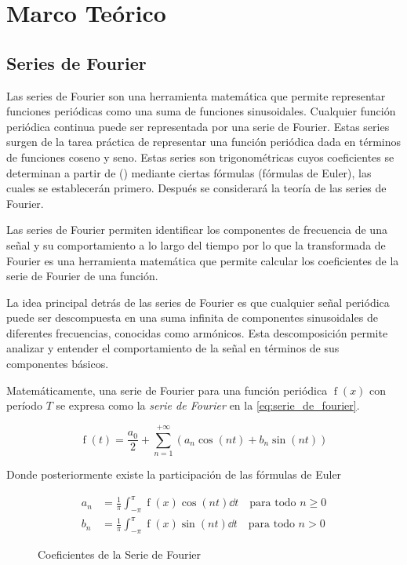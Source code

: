 \section{Marco Teórico }
\subsection{Series de Fourier}

Las series de Fourier son una herramienta matemática que permite representar funciones periódicas como una suma de funciones sinusoidales. Cualquier función periódica continua puede ser representada por una serie de Fourier. Estas series surgen de la tarea práctica de representar una función periódica dada en términos de funciones coseno y seno. Estas series son trigonométricas cuyos coeficientes se determinan a partir de () mediante ciertas fórmulas (fórmulas de Euler), las cuales se establecerán primero. Después se considerará la teoría de las series de Fourier.

Las series de Fourier permiten identificar los componentes de frecuencia de una señal y su comportamiento a lo largo del tiempo por lo que la transformada de Fourier es una herramienta matemática que permite calcular los coeficientes de la serie de Fourier de una función.

La idea principal detrás de las series de Fourier es que cualquier señal periódica puede ser descompuesta en una suma infinita de componentes sinusoidales de diferentes frecuencias, conocidas como armónicos. Esta descomposición permite analizar y entender el comportamiento de la señal en términos de sus componentes básicos.

Matemáticamente, una serie de Fourier para una función periódica \(\operatorname{f}(x)\) con período \(T\) se expresa como la \emph{serie de Fourier} en la \cref{eq:serie_de_fourier}.

\begin{equation}
	\operatorname{f}(t) = \frac{a_0}{2} + \sum_{n=1}^{+\infty} (a_n \cos(nt) + b_n \sin(nt))	
	\label{eq:serie_de_fourier}
\end{equation}


Donde posteriormente existe la participación de las fórmulas de Euler

\begin{figure}[H]
	\begin{equation}
		\begin{aligned}
			a_n &= \frac{1}{\pi} \int_{-\pi}^{\pi} \operatorname{f}(x) \cos(nt) \dd{t} \quad \text{para todo } n \geq 0 \\
			b_n &= \frac{1}{\pi} \int_{-\pi}^{\pi} \operatorname{f}(x) \sin(nt) \dd{t} \quad \text{para todo } n > 0
		\end{aligned}
		\label{eq:fourier_coeffs}
	\end{equation}
	\caption{Coeficientes de la Serie de Fourier}
\end{figure}

